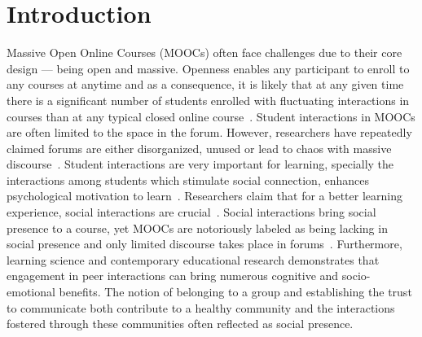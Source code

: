 \documentclass[format=acmsmall, review=false, screen=true]{acmart}
\begin{document}



\maketitle

\section{Introduction}
Massive Open Online Courses (MOOCs) often face challenges due to their core design --- being open and massive. Openness enables any participant to enroll to any courses at anytime and as a consequence, it is likely that at any given time there is a significant number of students enrolled with fluctuating interactions in courses than at any typical closed online course~\cite{oleksandra2016untangling}. Student interactions in MOOCs are often limited to the space in the forum. However, researchers have repeatedly claimed forums are either disorganized, unused or lead to chaos with massive discourse~\cite{coetzee2014should}. Student interactions are very important for learning, specially the interactions among students which stimulate social connection, enhances psychological motivation to learn~\cite{coetzee2014should}. Researchers claim that for a better learning experience, social interactions are crucial~\cite{yang2007students}. Social interactions bring social presence to a course, yet MOOCs are notoriously labeled as being lacking in social presence and only limited discourse takes place in forums~\cite{antonaci2019gamification}. Furthermore, learning science and contemporary educational research demonstrates that engagement in peer interactions can bring numerous cognitive and socio-emotional benefits. The notion of belonging to a group and establishing the trust to communicate both contribute to a healthy community and the interactions fostered through these communities often reflected as social presence.
\end{document}
